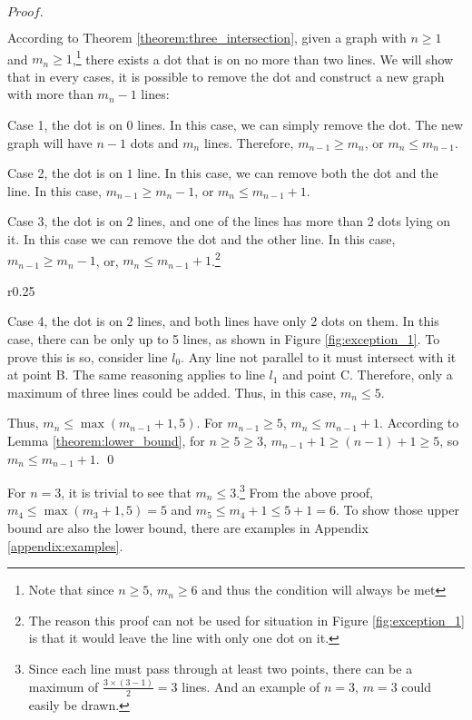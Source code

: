 \documentclass[a4paper, 12pt]{article}
\def\mypindent{1.35cm}
\newenvironment{my_indent}
 {\par\begingroup\leftskip\mypindent}
 {\par\endgroup}
\newcommand{\mycorf}{
    \leftskip-\mypindent
    \captionsetup{margin={-\mypindent,\mypindent}}}
\newcommand{\myproof}{
\vspace{-\parskip}$Proof.$\vspace{\dimexpr-\parskip-\baselineskip}}
\begin{document}
\myproof
\begin{my_indent}
According to Theorem \ref{theorem:three_intersection}, given a graph with $n\geq1$ and $m_n\geq1$,\footnote{Note that since $n\geq5$, $m_n\geq6$ and thus the condition will always be met} there exists a dot that is on no more than two lines. We will show that in every cases, it is possible to remove the dot and construct a new graph with more than $m_{n}-1$ lines:

Case 1, the dot is on $0$ lines. In this case, we can simply remove the dot. The new graph will have $n-1$ dots and $m_n$ lines. Therefore, $m_{n-1}\geq m_{n}$, or $m_{n}\leq m_{n-1}$.

Case 2, the dot is on $1$ line. In this case, we can remove both the dot and the line. In this case, $m_{n-1}\geq m_{n}-1$, or $m_{n}\leq m_{n-1}+1$.

Case 3, the dot is on $2$ lines, and one of the lines has more than 2 dots lying on it. In this case we can remove the dot and the other line. In this case, $m_{n-1}\geq m_{n}-1$, or, $m_{n}\leq m_{n-1}+1$.\footnote{The reason this proof can not be used for situation in Figure \ref{fig:exception_1} is that it would leave the line with only one dot on it.}

\begin{wrapfigure}{r}{0.25\textwidth}
    \mycorf
    \vspace{-0.5\baselineskip}
    
    \caption{3 potential lines when both line have only 2 dots}
    \label{fig:exception_1}
    \vspace{-1\baselineskip}
\end{wrapfigure}
Case 4, the dot is on $2$ lines, and both lines have only 2 dots on them. In this case, there can be only up to 5 lines, as shown in Figure \ref{fig:exception_1}. To prove this is so, consider line $l_0$. Any line not parallel to it must intersect with it at point B. The same reasoning applies to line $l_1$ and point C. Therefore, only a maximum of three lines could be added. Thus, in this case, $m_{n}\leq{5}$.

Thus, $m_{n}\leq\max(m_{n-1}+1,5)$. For $m_{n-1}\geq5$, $m_n\leq m_{n-1}+1$.
According to Lemma \ref{theorem:lower_bound}, for $n\geq5\geq3$, $m_{n-1}+1\geq (n-1)+1\geq5$, so $m_n\leq m_{n-1}+1$.
\qed
\end{my_indent}

For $n=3$, it is trivial to see that $m_n\leq3$.\footnote{Since each line must pass through at least two points, there can be a maximum of $\frac{3\times(3-1)}{2}=3$ lines. And an example of $n=3$, $m=3$ could easily be drawn.} From the above proof, $m_4\leq\max(m_3+1,5)=5$ and $m_5\leq m_4+1\leq 5+1=6$. To show those upper bound are also the lower bound, there are examples in Appendix \ref{appendix:examples}.
\end{document}

